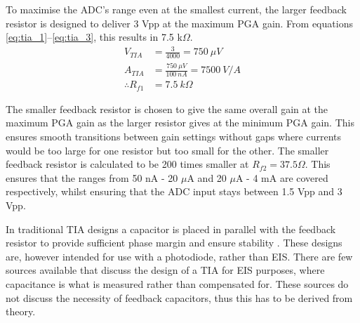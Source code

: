 To maximise the \ac{ADC}'s range even at the smallest current, the larger feedback resistor is designed to deliver 3 Vpp at the maximum \ac{PGA} gain. From equations \ref{eq:tia_1}--\ref{eq:tia_3}, this results in 7.5 k$\Omega$.
\begin{align}
        V_{TIA} &= \frac{3}{4000} = 750\ \mu V \label{eq:tia_1}\\
        A_{TIA} &= \frac{750\ \mu V}{100\ nA} = 7500\ V/A \\
        \therefore  R_{f1} &= 7.5\ k\Omega \label{eq:tia_3}
\end{align}

The smaller feedback resistor is chosen to give the same overall gain at the maximum \ac{PGA} gain as the larger resistor gives at the minimum \ac{PGA} gain. This ensures smooth transitions between gain settings without gaps where currents would be too large for one resistor but too small for the other. The smaller feedback resistor is calculated to be 200 times smaller at $R_{f2}=37.5 \Omega$. This ensures that the ranges from 50 nA - 20 $\mu$A and 20 $\mu$A - 4 mA are covered respectively, whilst ensuring that the \ac{ADC} input stays between 1.5 Vpp and 3 Vpp.

In traditional TIA designs a capacitor is placed in parallel with the feedback resistor to provide sufficient phase margin and ensure stability \cite{StabilizeYourTransimpedance}. These designs are, however intended for use with a photodiode, rather than \ac{EIS}. There are few sources available that discuss the design of a TIA for EIS purposes, where capacitance is what is measured rather than compensated for. These sources do not discuss the necessity of feedback capacitors, thus this has to be derived from theory.

